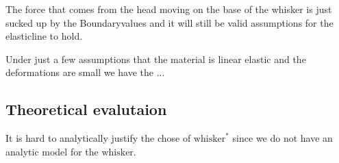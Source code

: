 The force that comes from the head moving on the base of the whisker is just 
sucked up by the Boundaryvalues and it will still be valid assumptions for the
elasticline to hold.

Under just a few assumptions that the material is linear elastic and the
deformations are small we have the ...

\subsection{Theoretical evalutaion}
    It is hard to analytically justify the chose of $\text{whisker}^*$ since we do not
    have an analytic model for the $\text{whisker}$.


